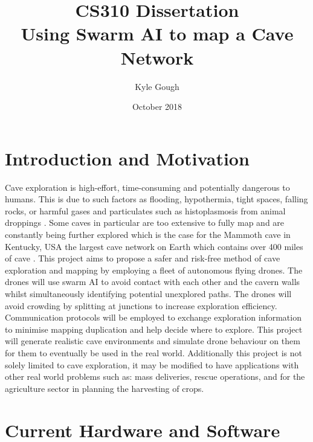 \documentclass[12pt]{article}
\title{CS310 Dissertation\\Using Swarm AI to map a Cave Network}
\author{Kyle Gough}
\date{October 2018}
\begin{document}
\maketitle

\section{Introduction and Motivation}

Cave exploration is high-effort, time-consuming and potentially dangerous to humans. This is due to such factors as flooding, hypothermia, tight spaces, falling rocks, or harmful gases and particulates such as histoplasmosis from animal droppings \cite{Histoplasmosis}. Some caves in particular are too extensive to fully map and are constantly being further explored which is the case for the Mammoth cave in Kentucky, USA the largest cave network on Earth which contains over 400 miles of cave \cite{Mammoth}. This project aims to propose a safer and risk-free method of cave exploration and mapping by employing a fleet of autonomous flying drones. The drones will use swarm AI to avoid contact with each other and the cavern walls whilst simultaneously identifying potential unexplored paths. The drones will avoid crowding by splitting at junctions to increase exploration efficiency. Communication protocols will be employed to exchange exploration information to minimise mapping duplication and help decide where to explore. This project will generate realistic cave environments and simulate drone behaviour on them for them to eventually be used in the real world.
Additionally this project is not solely limited to cave exploration, it may be modified to have applications with other real world problems such as: mass deliveries, rescue operations, and for the agriculture sector in planning the harvesting of crops.


\section{Current Hardware and Software}
\end{document}
